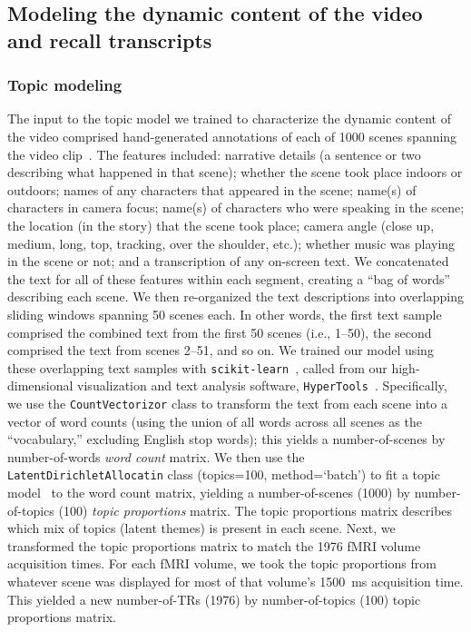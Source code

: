 \documentclass{article}
\begin{document}
\subsection*{Modeling the dynamic content of the video and recall transcripts}
\subsubsection*{Topic modeling}
The input to the topic model we trained to characterize the dynamic content of the video comprised hand-generated annotations of each of 1000 scenes spanning the video clip~\citep[generated by][]{ChenEtal17}.  The features included: narrative details (a sentence or two describing what happened in that scene); whether the scene took place indoors or outdoors; names of any characters that appeared in the scene; name(s) of characters in camera focus; name(s) of characters who were speaking in the scene; the location (in the story) that the scene took place; camera angle (close up, medium, long, top, tracking, over the shoulder, etc.); whether music was playing in the scene or not; and a transcription of any on-screen text.  We concatenated the text for all of these features within each segment, creating a ``bag of words'' describing each scene.  We then re-organized the text descriptions into overlapping sliding windows spanning 50 scenes each. In other words, the first text sample comprised the combined text from the first 50 scenes (i.e., 1--50), the second comprised the text from scenes 2--51, and so on.  We trained our model using these overlapping text samples with \texttt{scikit-learn}~\citep[version 0.19.1; ][]{PedrEtal11}, called from our high-dimensional visualization and text analysis software, \texttt{HyperTools}~\citep{HeusEtal18}.  Specifically, we use the \texttt{CountVectorizor} class to transform the text from each scene into a vector of word counts (using the union of all words across all scenes as the ``vocabulary,'' excluding English stop words); this yields a number-of-scenes by number-of-words \textit{word count} matrix.  We then use the \texttt{LatentDirichletAllocatin} class (topics=100, method=`batch') to fit a topic model~\citep{BleiEtal03} to the word count matrix, yielding a number-of-scenes (1000) by number-of-topics (100) \textit{topic proportions} matrix.  The topic proportions matrix describes which mix of topics (latent themes) is present in each scene.  Next, we transformed the topic proportions matrix to match the 1976 fMRI volume acquisition times.  For each fMRI volume, we took the topic proportions from whatever scene was displayed for most of that volume's 1500~ms acquisition time.  This yielded a new number-of-TRs (1976) by number-of-topics (100) topic proportions matrix.
\end{document}
